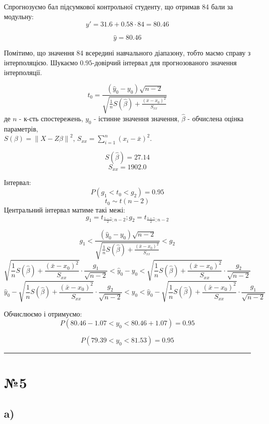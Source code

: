 \documentclass[11pt, a4paper]{article} %
\begin{document}
Спрогнозуємо бал підсумкової контрольної студенту, що отримав 84 бали за модульну:
$$y' = 31.6 + 0.58 \cdot 84 = 80.46$$

\begin{mdframed}[style=ans]
    $$\hat y = 80.46$$
\end{mdframed}

Помітимо, що значення 84 всередині навчального діапазону, тобто маємо справу з інтерполяцією.
Шукаємо $0.95$-довірчий інтервал для прогнозованого значення інтерполяції.

$$t_0 = \frac{(\hat y_0 - y_0) \sqrt{n-2}}{\sqrt{\frac{1}{n}S(\hat \beta) + \frac{(\bar x - x_0)^2}{S_{xx}}}}$$
де $n$ - к-сть спостережень, $y_0$ - істинне значення значення, $\hat \beta$ - обчислена оцінка параметрів, \\ 
$S(\beta) = \left\|X - Z\beta\right\|^2$, \quad
$S_{xx} = \sum_{i=1}^n (x_i-\bar x)^2$.

$$S(\hat \beta) = 27.14$$
$$S_{xx} = 1902.0$$

Інтервал:
$$P(g_1 < t_0 < g_2) = 0.95$$
$$t_0 \sim t(n-2)$$
Центральний інтервал матиме такі межі: $$g_1 = t_{\frac{1-\gamma}{2};n-2}; g_2 = t_{\frac{1+\gamma}{2};n-2}$$

$$g_1 < \frac{(\hat y_0 - y_0) \sqrt{n-2}}{\sqrt{\frac{1}{n}S(\hat \beta) + \frac{(\bar x - x_0)^2}{S_{xx}}}} < g_2$$
$$\sqrt{\frac{1}{n}S(\hat \beta) + \frac{(\bar x - x_0)^2}{S_{xx}}} \cdot \frac{g_1}{\sqrt{n-2}} < \hat y_0 - y_0 < \sqrt{\frac{1}{n}S(\hat \beta) + \frac{(\bar x - x_0)^2}{S_{xx}}} \cdot \frac{g_2}{\sqrt{n-2}}$$
$$\hat y_0 - \sqrt{\frac{1}{n}S(\hat \beta) + \frac{(\bar x - x_0)^2}{S_{xx}}} \cdot \frac{g_2}{\sqrt{n-2}} < y_0 < \hat y_0 - \sqrt{\frac{1}{n}S(\hat \beta) + \frac{(\bar x - x_0)^2}{S_{xx}}} \cdot \frac{g_1}{\sqrt{n-2}}$$

Обчислюємо і отримуємо:
$$P(80.46 - 1.07 < y_0 < 80.46 + 1.07) = 0.95$$
\begin{mdframed}[style=ans]
    $$P(79.39 < y_0 < 81.53) = 0.95$$
\end{mdframed}

\noindent\rule{\textwidth}{0.4pt}

\section*{№5}
\subsection*{a)}
\end{document}
